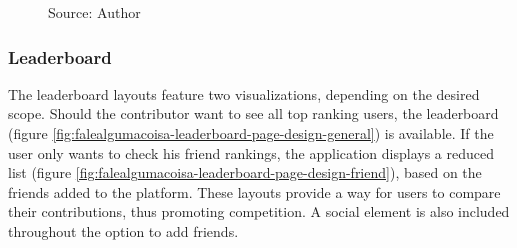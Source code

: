 \begin{figure}[ht]
    \caption*{Source: Author}
    \label{fig:falealgumacoisa-dashboard-page-design}
\end{figure}

\subsubsection{Leaderboard}

The leaderboard layouts feature two visualizations, depending on the desired scope. Should the contributor want to see all top ranking users, the leaderboard (figure \ref{fig:falealgumacoisa-leaderboard-page-design-general}) is available. If the user only wants to check his friend rankings, the application displays a reduced list (figure \ref{fig:falealgumacoisa-leaderboard-page-design-friend}), based on the friends added to the platform. These layouts provide a way for users to compare their contributions, thus promoting competition. A social element is also included throughout the option to add friends.

